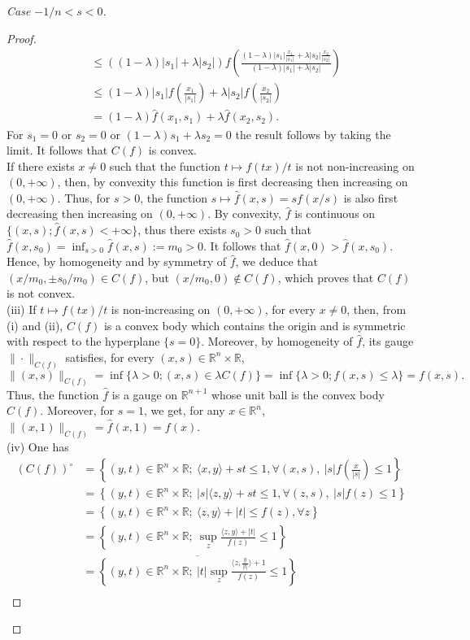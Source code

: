 \documentclass[10pt]{amsart}
\theoremstyle{definition}
\theoremstyle{remark}
\newcommand{\R}{\mathbb{R}}
\newcommand{\f}{\widehat{f}}
\begin{document}
\begin{proof}[Case $-1/n<s< 0$]
\begin{proof}
\begin{align*}
&\le ((1-\lambda)|s_1|+\lambda |s_2|) f\left(\frac{(1-\lambda)|s_1|\frac{x_1}{|s_1|}+\lambda |s_2|\frac{x_2}{|s_2|}}{(1-\lambda)|s_1|+\lambda |s_2|}\right)\\
&\le (1-\lambda)|s_1|f\left(\frac{x_1}{|s_1|}\right)+\lambda|s_2|f\left(\frac{x_2}{|s_2|}\right)\\
&= (1-\lambda)\f(x_1,s_1)+\lambda \f(x_2,s_2).
\end{align*}
For $s_1=0$ or $s_2=0$ or $(1-\lambda)s_1+\lambda s_2=0$  the result follows by taking the limit. It follows that $C(f)$ is convex. \\
If there exists $x\neq0$ such that the function  $t\mapsto f(tx)/t$ is not non-increasing on $(0,+\infty)$, then, by convexity this function is first decreasing then increasing on $(0,+\infty)$. Thus, for $s>0$, the function $s\mapsto \f(x,s)=sf(x/s)$ is also first decreasing then increasing on $(0,+\infty)$. By convexity, $\f$ is continuous on $\{(x,s);\f(x,s)<+\infty\}$, thus there exists $s_0>0$ such that $\f(x,s_0)=\inf_{s>0}\f(x,s):=m_0>0$. It follows that $\f(x,0)>\f(x,s_0)$. Hence, by homogeneity and by symmetry of $\f$, we deduce that $(x/m_0,\pm s_0/m_0)\in C(f)$, but $(x/m_0,0)\notin C(f)$, which proves that $C(f)$ is not convex. \\
(iii) If $t\mapsto f(tx)/t$ is non-increasing on $(0,+\infty)$, for every $x\neq0$, then, from (i) and (ii), $C(f)$ is a convex body which contains the origin and is symmetric with respect to the hyperplane $\{s=0\}$. Moreover, by homogeneity of $\f$, its gauge $\|\cdot\|_{C(f)}$ satisfies, for every $(x,s)\in\R^n\times\R$, 
\[
\|(x,s)\|_{C(f)}=\inf\{\lambda>0; (x,s)\in\lambda C(f)\}=\inf\{\lambda>0; f(x,s)\le\lambda\}=f(x,s).
\]
Thus, the function $\f$ is a gauge on $\R^{n+1}$ whose unit ball is the convex body $C(f)$. Moreover, for $s=1$, we get, for any $x\in\R^n$, $\|(x,1)\|_{C(f)}=\f(x,1)=f(x)$.\\
(iv) One has
\begin{align*}
(C(f))^\circ &= \left\{(y,t)\in\R^n\times\R;\ \langle x,y\rangle+st\le1, \forall (x,s),\ |s|f\left(\frac{x}{|s|}\right)\le1\right\}\\
&= \left\{(y,t)\in\R^n\times\R;\ |s|\langle z,y\rangle+st\le1, \forall (z,s),\ |s|f(z)\le1\right\}\\
&= \left\{(y,t)\in\R^n\times\R;\ \langle z,y\rangle+|t|\le f(z), \forall z\right\}\\
&= \left\{(y,t)\in\R^n\times\R;\ \sup_z\frac{\langle z,y\rangle+|t|}{f(z)}\le1\right\}\\
&= \overline{\left\{(y,t)\in\R^n\times\R;\ |t|\sup_z\frac{\langle z,\frac{y}{|t|}\rangle+1}{f(z)}\le1\right\}}\\

\end{align*}
\end{proof}
\end{proof}
\end{document}
